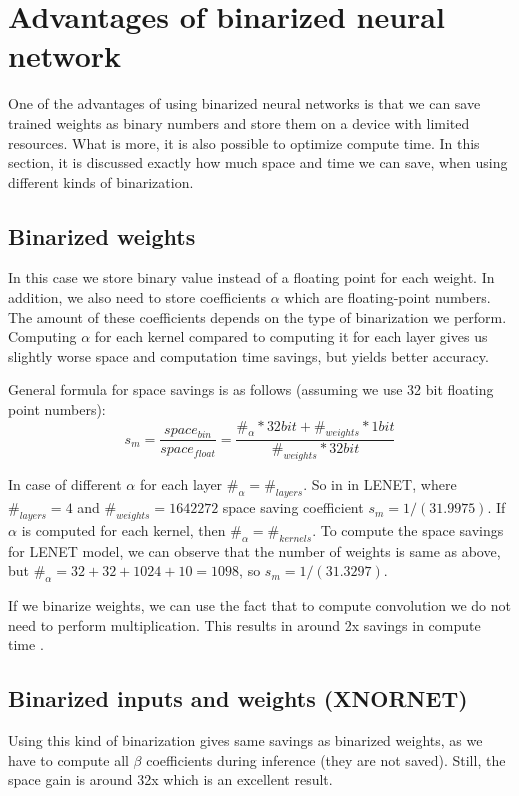 \documentclass[licencjacka]{pracamgr}
\begin{document}
	\chapter{Advantages of binarized neural network}
    One of the advantages of using binarized neural networks is that we can save trained weights as binary numbers and store them on a device with limited resources. What is more, it is also possible to optimize compute time. In this section, it is discussed exactly how much space and time we can save, when using different kinds of binarization.
    
    \section{Binarized weights}
        In this case we store binary value instead of a floating point for each weight. In addition, we also need to store coefficients $\alpha$ which are floating-point numbers. The amount of these coefficients depends on the type of binarization we perform. Computing $\alpha$ for each kernel compared to computing it for each layer gives us slightly worse space and computation time savings, but yields better accuracy.
        
        General formula for space savings is as follows (assuming we use 32 bit floating point numbers):
        $$s_m =  \frac{space_{bin}}{space_{float}} = \frac{\#_\alpha * 32bit + \#_{weights}*1bit}{\#_{weights} * 32bit} $$
        
        In case of different $\alpha$ for each layer $\#_\alpha = \#_{layers}$. So in in LENET, where $\#_{layers} = 4$ and $\#_{weights} = 1642272$ space saving coefficient $s_m = 1/(31.9975)$. If $\alpha$ is computed for each kernel, then $\#_\alpha = \#_{kernels}$. To compute the space savings for LENET model, we can observe that the number of weights is same as above, but $\#_\alpha = 32+32+1024+10 = 1098$, so $s_m = 1/(31.3297)$.
            
	    If we binarize weights, we can use the fact that to compute convolution we do not need to perform multiplication. This results in around 2x savings in compute time \cite{xornet}.
	    
	    \section{Binarized inputs and weights (XNORNET)}
	    Using this kind of binarization gives same savings as binarized weights, as we have to compute all $\beta$ coefficients during inference (they are not saved). Still, the space gain is around 32x which is an excellent result.
	    
\end{document}
